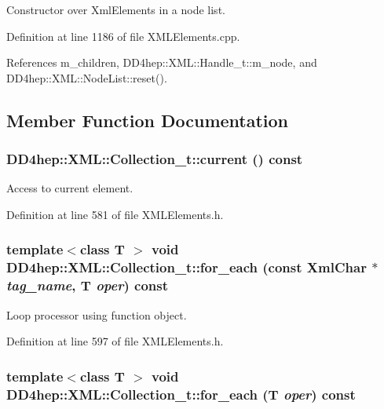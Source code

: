 Constructor over XmlElements in a node list. 

Definition at line 1186 of file XMLElements.cpp.

References m\_\-children, DD4hep::XML::Handle\_\-t::m\_\-node, and DD4hep::XML::NodeList::reset().

\subsection{Member Function Documentation}
\hypertarget{class_d_d4hep_1_1_x_m_l_1_1_collection__t_aedddc0c0d00f40248bbfe5a499fc532f}{
\subsubsection[{current}]{ DD4hep::XML::Collection\_\-t::current () const}}
\label{class_d_d4hep_1_1_x_m_l_1_1_collection__t_aedddc0c0d00f40248bbfe5a499fc532f}


Access to current element. 

Definition at line 581 of file XMLElements.h.\hypertarget{class_d_d4hep_1_1_x_m_l_1_1_collection__t_a5aa79a812e3248a24db7478b613b2bab}{
\subsubsection[{for\_\-each}]{\setlength{\rightskip}{0pt plus 5cm}template$<$class T $>$ void DD4hep::XML::Collection\_\-t::for\_\-each (const {\bf XmlChar} $\ast$ {\em tag\_\-name}, \/  {\bf T} {\em oper}) const}}
\label{class_d_d4hep_1_1_x_m_l_1_1_collection__t_a5aa79a812e3248a24db7478b613b2bab}


Loop processor using function object. 

Definition at line 597 of file XMLElements.h.\hypertarget{class_d_d4hep_1_1_x_m_l_1_1_collection__t_a191e6f7f84a7ebe38f422a59e4227d36}{
\subsubsection[{for\_\-each}]{\setlength{\rightskip}{0pt plus 5cm}template$<$class T $>$ void DD4hep::XML::Collection\_\-t::for\_\-each ({\bf T} {\em oper}) const}}
\label{class_d_d4hep_1_1_x_m_l_1_1_collection__t_a191e6f7f84a7ebe38f422a59e4227d36}



